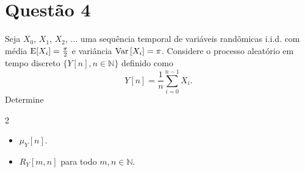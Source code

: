 \section{Questão 4}

Seja $X_0$, $X_1$, $X_2$, $\ldots$ uma sequência temporal de variáveis randômicas i.i.d. com média
$\mathrm{E}\!\left[X_i\right] = \frac{\pi}{2}$
e variância
$\mathrm{Var}\left[X_i\right] = \pi$.
Considere o processo aleatório em tempo discreto $\{Y[n], n \in \mathbb{N}\}$ definido como
%
$$
    Y[n] = \frac{1}{n} \sum_{i=0}^{n-1} X_i.
$$
Determine
%
\begin{multicols}{2}
\begin{itemize}
    \item [a)] $\mu_Y[n]$.
    \item [b)] $R_Y[m,n]$ para todo $m,n \in \mathbb{N}$.
\end{itemize}
\end{multicols}

